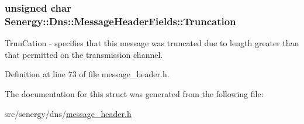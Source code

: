 \hypertarget{struct_senergy_1_1_dns_1_1_message_header_fields_a15d1ee99bf788c080001c3216c88274c}{
\subsubsection[{Truncation}]{\setlength{\rightskip}{0pt plus 5cm}unsigned char Senergy\-::\-Dns\-::\-Message\-Header\-Fields\-::\-Truncation}}\label{struct_senergy_1_1_dns_1_1_message_header_fields_a15d1ee99bf788c080001c3216c88274c}


Trun\-Cation -\/ specifies that this message was truncated due to length greater than that permitted on the transmission channel. 



Definition at line 73 of file message\-\_\-header.\-h.



The documentation for this struct was generated from the following file\-:\begin{DoxyCompactItemize}
\item 
src/senergy/dns/\hyperlink{message__header_8h}{message\-\_\-header.\-h}\end{DoxyCompactItemize}

